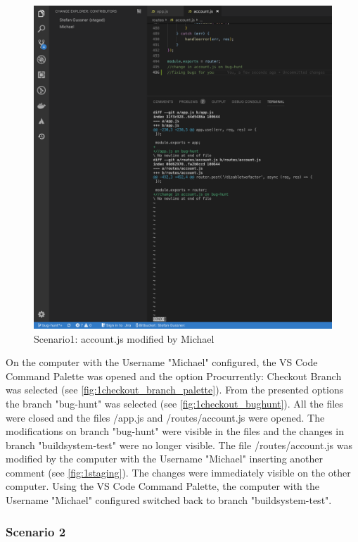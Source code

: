 \begin{figure}[h]
    \centering
    \includegraphics[width=1\textwidth]{figures/screenshots/scenarios/1staging_view.png}
    \caption{Scenario1: account.js modified by Michael}
    \label{fig:1staging}
\end{figure}

On the computer with the Username "Michael" configured, the VS Code Command Palette was opened and the option Procurrently: Checkout Branch was selected (see \autoref{fig:1checkout_branch_palette}). From the presented options the branch "bug-hunt" was selected (see \autoref{fig:1checkout_bughunt}). All the files were closed and the files /app.js and /routes/account.js were opened. The modifications on branch "bug-hunt" were visible in the files and the changes in branch "buildsystem-test" were no longer visible. The file /routes/account.js was modified by the computer with the Username "Michael" inserting another comment (see \autoref{fig:1staging}). The changes were immediately visible on the other computer. Using the VS Code Command Palette, the computer with the Username "Michael" configured switched back to branch "buildsystem-test".

\subsubsection{Scenario 2}

